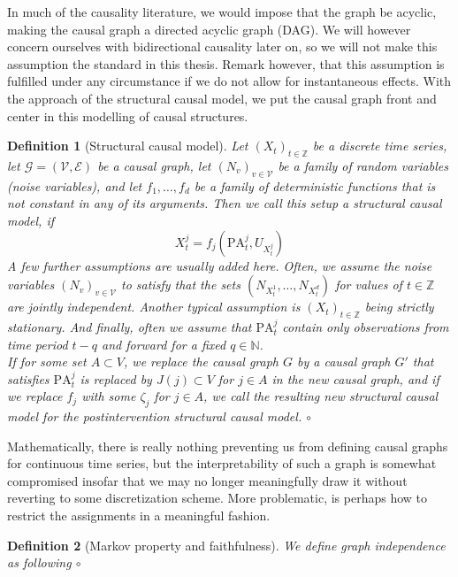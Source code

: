 \documentclass[11pt, a4paper]{memoir}
\theoremstyle{break}
\theoremstyle{break}
\newtheorem{innerdefn}{Definition}
\newenvironment{defn}
  {\begin{innerdefn}}
  {\ensuremath{\circ}\end{innerdefn}}
\theoremstyle{nonumberplain}
\newcommand{\mN}{\mathbb{N}}
\newcommand{\mZ}{\mathbb{Z}}
\begin{document}
In much of the causality literature, we would impose that the graph be acyclic, making the causal graph a directed acyclic graph (DAG). We will however concern ourselves with bidirectional causality later on, so we will not make this assumption the standard in this thesis. Remark however, that this assumption is fulfilled under any circumstance if we do not allow for instantaneous effects. With the approach of the structural causal model, we put the causal graph front and center in this modelling of causal structures.
\begin{defn}[Structural causal model]
Let $(X_t)_{t\in \mZ}$ be a discrete time series, let $\mathcal{G}=(\mathcal{V},\mathcal{E})$ be a causal graph, let $(N_v)_{v\in \mathcal{V}}$ be a family of random variables (noise variables), and let $f_1,\ldots,f_d$ be a family of deterministic functions that is not constant in any of its arguments. Then we call this setup a \emph{structural causal model}, if
$$X_t^j=f_j(\text{PA}_t^j,U_{X_{t}^j})$$
A few further assumptions are usually added here. Often, we assume the noise variables $(N_v)_{v\in \mathcal{V}}$ to satisfy that the sets $(N_{X_t^1},\ldots,N_{X_t^{d}})$ for values of $t\in \mZ$ are jointly independent. Another typical assumption is $(X_t)_{t\in \mZ}$ being strictly stationary. And finally, often we assume that $\text{PA}_t^j$ contain only observations from time period $t-q$ and forward for a fixed $q\in \mN$.\\
If for some set $A\subset V$, we replace the causal graph $G$ by a causal graph $G'$ that satisfies $\text{PA}_t^j$ is replaced by $J(j)\subset V$ for $j\in A$ in the new causal graph, and if we replace $f_j$ with some $\zeta_j$ for $j\in A$, we call the resulting new structural causal model for the \textit{postintervention structural causal model}.
\end{defn}
Mathematically, there is really nothing preventing us from defining causal graphs for continuous time series, but the interpretability of such a graph is somewhat compromised insofar that we may no longer meaningfully draw it without reverting to some discretization scheme. More problematic, is perhaps how to restrict the assignments in a meaningful fashion.
\begin{defn}[Markov property and faithfulness]
We define graph independence as following
\end{defn}
\end{document}
